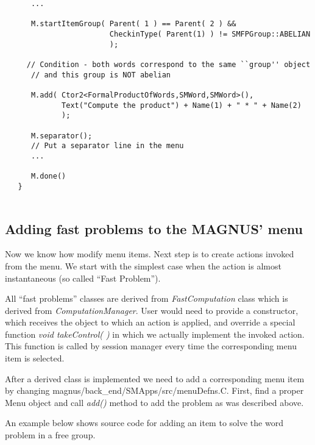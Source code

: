\documentclass[12pt]{article}
\begin{document}
\begin{verbatim}
      ...

      M.startItemGroup( Parent( 1 ) == Parent( 2 ) &&
                        CheckinType( Parent(1) ) != SMFPGroup::ABELIAN
                        );

     // Condition - both words correspond to the same ``group'' object
      // and this group is NOT abelian
      
      M.add( Ctor2<FormalProductOfWords,SMWord,SMWord>(),
             Text("Compute the product") + Name(1) + " * " + Name(2)
             );
      
      M.separator();
      // Put a separator line in the menu
      ...

      M.done()
   }
          
  \end{verbatim}
  \normalsize

  \subsection{ Adding fast problems to the MAGNUS' menu}
  Now we know how modify menu items. Next step is to create actions
  invoked from the menu. We start with the simplest case when the action
  is almost instantaneous (so called ``Fast Problem''). 

  All ``fast problems'' classes are derived from \emph{FastComputation} class
  which is derived from \emph{ComputationManager}. 
  User would need to provide a constructor, which  receives
  the object to which an action is applied, and override a special function
  \emph{ void takeControl( )} in which we actually implement the invoked action.
  This function is called by session manager every time the corresponding 
  menu item is selected.

  After a derived class is implemented we need to add a corresponding menu 
  item by changing magnus/back\_end/SMApps/src/menuDefns.C.
  First, find a proper Menu object and call \emph{add()} method to 
  add the problem as was described above.

  An example below shows  source code for adding an item 
  to  solve the word problem in a free group.
\end{document}
